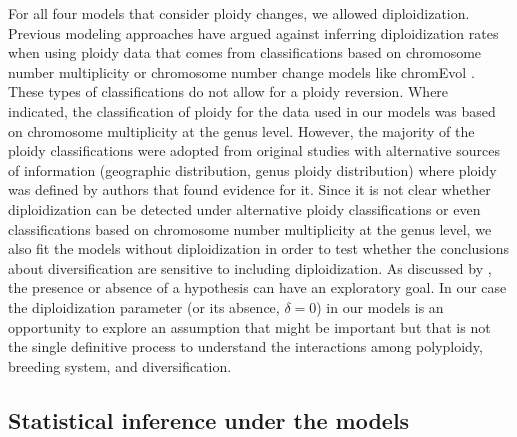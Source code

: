 For all four models that consider ploidy changes, we allowed diploidization.
Previous modeling approaches \citep{mayrose_2011} have argued against inferring diploidization rates when using ploidy data that comes from classifications based on chromosome number multiplicity or chromosome number change models like chromEvol \citep{mayrose_2010}.
These types of classifications do not allow for a ploidy reversion.
Where indicated, the classification of ploidy for the data used in our models was based on chromosome multiplicity at the genus level.
However, the majority of the ploidy classifications were adopted from original studies with alternative sources of information (\eg geographic distribution, genus ploidy distribution) where ploidy was defined by authors that found evidence for it.
Since it is not clear whether diploidization can be detected under alternative ploidy classifications or even classifications based on chromosome number multiplicity at the genus level, we also fit the models without diploidization in order to test  whether the conclusions about diversification are sensitive to including diploidization.
As discussed by \citet{servedio_2014}, the presence or absence of a hypothesis can have an exploratory goal.
In our case the diploidization parameter (or its absence, $\delta=0$) in our models is an opportunity to explore an assumption that might be important but that is not the single definitive process to understand the interactions among polyploidy, breeding system, and diversification.

\subsection{Statistical inference under the models}

